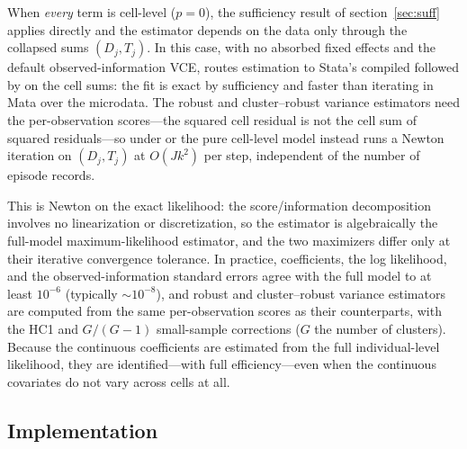 \documentclass[12pt,a4paper]{article}
\begin{document}
When \emph{every} term is cell-level (\(p = 0\)), the sufficiency result
of section~\ref{sec:suff} applies directly and the
estimator depends on the data only through the collapsed sums
\((D_j, T_j)\). In this case, with no absorbed fixed effects and the
default observed-information VCE,  routes estimation to
Stata's compiled  followed by  on the
cell sums: the fit is exact by sufficiency and faster than iterating in
Mata over the microdata. The robust and cluster--robust variance
estimators need the per-observation scores---the squared cell residual
is not the cell sum of squared residuals---so under 
or  the pure cell-level model instead runs a Newton
iteration on \((D_j, T_j)\) at \(O(Jk^2)\) per step, independent of the
number of episode records.

This is Newton on the exact likelihood: the score/information
decomposition involves no linearization or discretization, so the
estimator is algebraically the full-model maximum-likelihood estimator,
and the two maximizers differ only at their iterative convergence
tolerance. In practice, coefficients, the log likelihood, and the
observed-information standard errors agree with the full 
model to at least \(10^{-6}\) (typically \(\sim 10^{-8}\)), and robust
and cluster--robust variance estimators are computed from the same
per-observation scores as their  counterparts, with the
HC1 and \(G/(G-1)\) small-sample corrections (\(G\) the number of
clusters). Because the continuous coefficients are estimated from the
full individual-level likelihood, they are identified---with full
efficiency---even when the continuous covariates do not vary across
cells at all.

\subsection{Implementation}\label{implementation}
\end{document}
